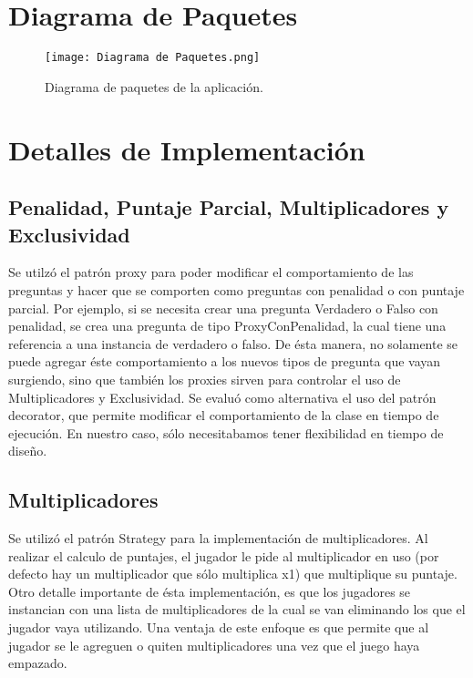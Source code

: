 \documentclass[titlepage,a4paper]{article}
\begin{document}
\section{Diagrama de Paquetes}\label{sec:diagramasdepaquete}

\begin{figure}[H]
\centering
\texttt{[image: Diagrama de Paquetes.png]}
\caption{\label{fig:seq01}Diagrama de paquetes de la aplicación.}
\end{figure}


\section{Detalles de Implementación}\label{sec:detallesdeimplementacion}

\subsection{Penalidad, Puntaje Parcial, Multiplicadores y Exclusividad} Se utilzó el patrón proxy para poder modificar el comportamiento de las preguntas y hacer que se comporten como preguntas con penalidad o con puntaje parcial. Por ejemplo, si se necesita crear una pregunta Verdadero o Falso con penalidad, se crea una pregunta de tipo ProxyConPenalidad, la cual tiene una referencia a una instancia de verdadero o falso. De
ésta manera, no solamente se puede agregar éste comportamiento a los nuevos tipos de pregunta que vayan surgiendo, sino que también los proxies sirven para controlar el uso de Multiplicadores y Exclusividad. Se evaluó como alternativa el uso del patrón decorator, que permite modificar el comportamiento de la clase en tiempo de ejecución. En nuestro caso, sólo necesitabamos tener flexibilidad en tiempo de diseño.

\subsection{Multiplicadores} Se utilizó el patrón Strategy para la implementación de multiplicadores. Al realizar el calculo de puntajes, el jugador le pide al multiplicador en uso (por defecto hay un multiplicador que sólo multiplica x1) que multiplique su puntaje. Otro detalle importante de ésta implementación, es que los jugadores se instancian con una lista de multiplicadores de la cual se van eliminando los que el jugador vaya utilizando. Una ventaja de \’este enfoque es que permite que al jugador se le agreguen o quiten multiplicadores una vez que el juego haya empazado.
\end{document}
